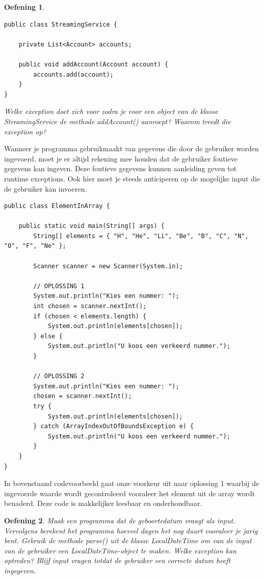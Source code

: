 \documentclass{tstextbook}
\newtheorem{envoefening}{Oefening}[chapter]
\newenvironment{oefening}
               {\begin{boxexercise}\begin{envoefening}}
               {\end{envoefening}\end{boxexercise}}
\begin{document}
\begin{oefening}

\begin{lstlisting}
public class StreamingService {

	private List<Account> accounts;

	public void addAccount(Account account) {
		accounts.add(account);
	}
}
\end{lstlisting}

Welke exception doet zich voor zodra je voor een object van de klasse StreamingService de methode addAccount() aanroept? Waarom treedt die exception op?
\end{oefening}

Wanneer je programma gebruikmaakt van gegevens die door de gebruiker worden ingevoerd, moet je er altijd rekening mee houden dat de gebruiker foutieve gegevens kan ingeven. Deze foutieve gegevens kunnen aanleiding geven tot runtime exceptions. Ook hier moet je steeds anticiperen op de mogelijke input die de gebruiker kan invoeren. 


\begin{lstlisting}
public class ElementInArray {

	public static void main(String[] args) {
		String[] elements = { "H", "He", "Li", "Be", "B", "C", "N", "O", "F", "Ne" };

		Scanner scanner = new Scanner(System.in);
		
		// OPLOSSING 1
		System.out.println("Kies een nummer: ");
		int chosen = scanner.nextInt();
		if (chosen < elements.length) {
			System.out.println(elements[chosen]);
		} else {
			System.out.println("U koos een verkeerd nummer.");
		}

	    // OPLOSSING 2
		System.out.println("Kies een nummer: ");
		chosen = scanner.nextInt();
		try {
			System.out.println(elements[chosen]);
		} catch (ArrayIndexOutOfBoundsException e) {
			System.out.println("U koos een verkeerd nummer.");
		}
	}
}
\end{lstlisting}

In bovenstaand codevoorbeeld gaat onze voorkeur uit naar oplossing 1 waarbij de ingevoerde waarde wordt gecontroleerd vooraleer het element uit de array wordt benaderd. Deze code is makkelijker leesbaar en onderhoudbaar.

\begin{oefening}
Maak een programma dat de geboortedatum vraagt als input. Vervolgens berekent het programma hoeveel dagen het nog duurt vooraleer je jarig bent. Gebruik de methode parse() uit de klasse LocalDateTime om van de input van de gebruiker een LocalDateTime-object te maken. Welke exception kan optreden? Blijf input vragen totdat de gebruiker een correcte datum heeft ingegeven.
\end{oefening}
\end{document}
